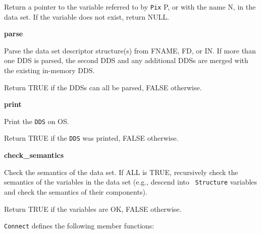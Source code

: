\begin{description}
Return a pointer to the variable referred to by {\tt Pix} P,
or with the name N, in the data set. If the variable does not
exist, return NULL.

\item {\bf parse}


Parse the data set descriptor structure(s) from FNAME, FD, or IN.  If more
than one DDS is parsed, the second DDS and any additional DDSs are merged
with the existing in-memory DDS.

Return TRUE if the DDSs can all be parsed, FALSE otherwise.

\item {\bf print}


Print the {\tt DDS} on OS.

Return TRUE if the {\tt DDS} was printed, FALSE otherwise.

\item {\bf check\_semantics}


Check the semantics of the data set. If ALL is TRUE, recursively check the
semantics of the variables in the data set (e.g., descend into {\tt
Structure} variables and check the semantics of their components).

Return TRUE if the variables are OK, FALSE otherwise.

\end{description}

{\tt Connect} defines the following member functions:

